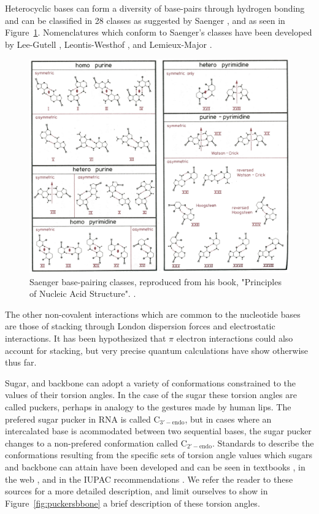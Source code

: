 Heterocyclic bases can form a diversity of base-pairs through hydrogen
bonding and  can be classified in  28 classes as  suggested by Saenger
\cite{saenger1984},   and  as   seen   in  Figure~\ref{fig:saenger28}.
Nomenclatures which  conform to Saenger's classes  have been developed
by Lee-Gutell \cite{lee2004}, Leontis-Westhof \cite{leontis2002b}, and
Lemieux-Major \cite{lemieux2002}.

\begin{figure}
\centering
\includegraphics[scale=3.8, angle=90]{Chapter1/saenger28b.png}
\caption{Saenger  base-pairing  classes,  reproduced  from  his  book,
  "Principles of Nucleic Acid Structure". \cite{saenger1984}.}
\label{fig:saenger28}
\end{figure}  

The other non-covalent interactions which are common to the nucleotide
bases  are those  of  stacking through  London  dispersion forces  and
electrostatic  interactions.   It  has  been hypothesized  that  $\pi$
electron  interactions  could  also  account for  stacking,  but  very
precise quantum calculations \cite{sponer1996, sponer1997} have show
otherwise thus far.

Sugar, and  backbone can adopt a variety  of conformations constrained
to the values of their torsion  angles. In the case of the sugar these
torsion angles are called puckers,  perhaps in analogy to the gestures
made  by human  lips.   The prefered  sugar  pucker in  RNA is  called
C$_{3'-\textrm{endo}}$,  but in  cases where  an intercalated  base is
acommodated between two sequential  bases, the sugar pucker changes to
a non-prefered  conformation called C$_{2'-\textrm{endo}}$.  Standards
to  describe the  conformations resulting  from the  specific  sets of
torsion angle  values which sugars  and backbone can attain  have been
developed and can be seen  in textbooks \cite{saenger1984}, in the web
\cite{jenaurl}, and in  the IUPAC recommendations \cite{iupac1983}. We
refer the reader to these sources for a more detailed description, and
limit  ourselves  to  show  in Figure~\ref{fig:puckersbbone}  a  brief
description of these torsion angles.

